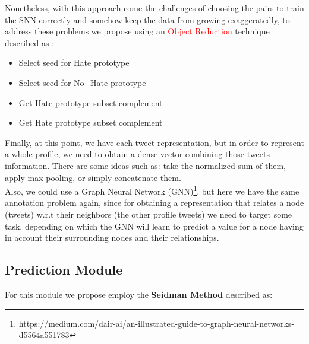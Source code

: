 \documentclass[11pt]{article}
\begin{document}
	Nonetheless, with this approach come the challenges of choosing the pairs to train the SNN correctly and somehow keep the data from growing exaggeratedly, to address these problems we propose using an \textcolor{red}{Object Reduction} technique  described as :
	
	\begin{itemize}
		\item Select seed for Hate prototype
		\item Select seed for No\_Hate prototype
		\item Get Hate prototype subset complement
		\item Get Hate prototype subset complement
	\end{itemize}

	Finally, at this point, we have each tweet representation, but in order to represent a whole profile, we need to obtain a dense vector combining those tweets information. There are some ideas such as: take the normalized sum of them, apply max-pooling, or simply concatenate them.\\

	Also, we could use a Graph Neural Network (GNN)\footnote{https://medium.com/dair-ai/an-illustrated-guide-to-graph-neural-networks-d5564a551783}, but here we have the same annotation problem again, since for obtaining a representation that relates a node (tweets) w.r.t their neighbors (the other profile tweets) we need to target some task, depending on which the GNN will learn to predict a value for a node having in account their surrounding nodes and their relationships.
	\clearpage
	\subsection*{Prediction Module}
	
	For this module we propose employ the\textbf{ Seidman Method} described as:
	
\end{document}
